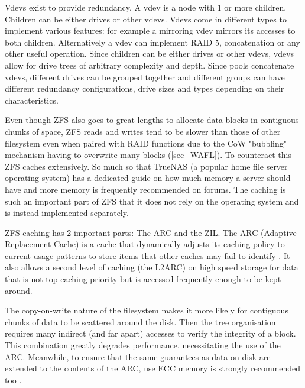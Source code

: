             Vdevs exist to provide redundancy. A vdev is a node with 1 or more
            children. Children can be either drives or other vdevs. Vdevs come
            in different types to implement various features: for example a
            mirroring vdev mirrors its accesses to both children. Alternatively
            a vdev can implement RAID 5, concatenation or any other useful
            operation. Since children can be either drives or other vdevs,
            vdevs allow for drive trees of arbitrary complexity and depth.
            Since pools concatenate vdevs, different drives can be grouped
            together and different groups can have different redundancy
            configurations, drive sizes and types depending on their
            characteristics.

            Even though ZFS also goes to great lengths to allocate data blocks
            in contiguous chunks of space, ZFS reads and writes tend to be
            slower than those of other filesystem even when paired with RAID
            functions due to the CoW "bubbling" mechanism having to overwrite
            many blocks \cite{ZFS} (\ref{sec_WAFL}). To counteract this ZFS
            caches extensively. So much so that TrueNAS (a popular home file
            server operating system) has a dedicated guide on how much memory a
            server should have \cite{TrueNAS_hardware_guide} and more memory is
            frequently recommended on forums. The caching is such an important
            part of ZFS that it does not rely on the operating system and is
            instead implemented separately.

            ZFS caching has 2 important parts: The ARC and the ZIL. The ARC
            (Adaptive Replacement Cache) is a cache that dynamically adjusts
            its caching policy to current usage patterns to store items that
            other caches may fail to identify \cite{ARC}. It also allows a
            second level of caching (the L2ARC) on high speed storage for data
            that is not top caching priority but is accessed frequently enough
            to be kept around.

            The copy-on-write nature of the filesystem makes it more likely for
            contiguous chunks of data to be scattered around the disk. Then the
            tree organisation requires many indirect (and far apart) accesses
            to verify the integrity of a block. This combination greatly
            degrades performance, necessitating the use of the ARC. Meanwhile,
            to ensure that the same guarantees as data on disk are extended to
            the contents of the ARC, use ECC memory is strongly recommended too
            \cite{TrueNAS_hardware_guide}.

